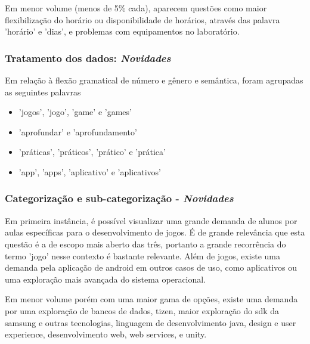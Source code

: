 Em menor volume (menos de 5\% cada), aparecem questões como maior flexibilização do horário ou disponibilidade de horários, através das palavra 'horário' e 'dias', e problemas com equipamentos no laboratório.

\subsubsection*{Tratamento dos dados: \textit{Novidades}}

Em relação à flexão gramatical de número e gênero e semântica, foram agrupadas as seguintes palavras

\begin{itemize}
\item 'jogos', 'jogo', 'game' e 'games'
\item 'aprofundar' e 'aprofundamento'
\item 'práticas', 'práticos', 'prático' e 'prática'
\item 'app', 'apps', 'aplicativo' e 'aplicativos'
\end{itemize}



\subsubsection*{Categorização e sub-categorização - \textit{Novidades}}

Em primeira instância, é possível visualizar uma grande demanda de alunos por aulas específicas para o desenvolvimento de jogos. É de grande relevância que esta questão é a de escopo mais aberto das três, portanto a grande recorrência do termo 'jogo' nesse contexto é bastante relevante. Além de jogos, existe uma demanda pela aplicação de android em outros casos de uso, como aplicativos ou uma exploração mais avançada do sistema operacional. 

Em menor volume porém com uma maior gama de opções, existe uma demanda por uma exploração de bancos de dados, tizen, maior exploração do sdk da samsung e outras tecnologias, linguagem de desenvolvimento java, design e user experience, desenvolvimento web, web services, e unity. 

